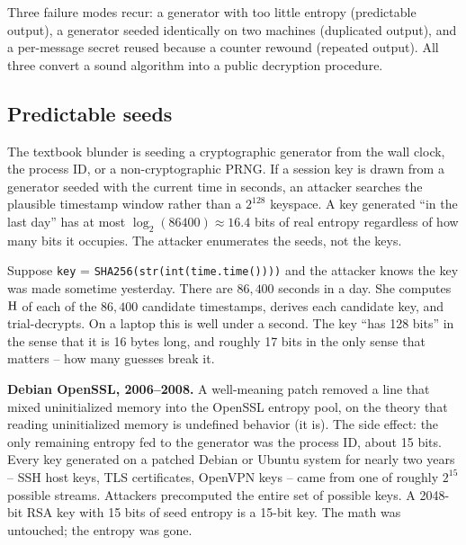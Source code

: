 Three failure modes recur: a generator with too little entropy (predictable output), a generator seeded identically on two machines (duplicated output), and a per-message secret reused because a counter rewound (repeated output). All three convert a sound algorithm into a public decryption procedure.

\subsection{Predictable seeds}
\label{ch38:predictable-seed}

The textbook blunder is seeding a cryptographic generator from the wall clock, the process ID, or a non-cryptographic PRNG. If a session key is drawn from a generator seeded with the current time in seconds, an attacker searches the plausible timestamp window rather than a $2^{128}$ keyspace. A key generated ``in the last day'' has at most $\log_2(86400) \approx 16.4$ bits of real entropy regardless of how many bits it occupies. The attacker enumerates the seeds, not the keys.

\begin{example}
\label{ch38:ex-time-seed}
Suppose \texttt{key} = \texttt{SHA256(\allowbreak str(\allowbreak int(\allowbreak time.\allowbreak time())))\allowbreak [:16]} and the attacker knows the key was made sometime yesterday. There are $86{,}400$ seconds in a day. She computes $\operatorname{H}$ of each of the $86{,}400$ candidate timestamps, derives each candidate key, and trial-decrypts. On a laptop this is well under a second. The key ``has 128 bits'' in the sense that it is 16 bytes long, and roughly 17 bits in the only sense that matters -- how many guesses break it.
\end{example}

\begin{attackbox}
\textbf{Debian OpenSSL, 2006--2008.} A well-meaning patch removed a line that mixed uninitialized memory into the OpenSSL entropy pool, on the theory that reading uninitialized memory is undefined behavior (it is). The side effect: the only remaining entropy fed to the generator was the process ID, about 15 bits. Every key generated on a patched Debian or Ubuntu system for nearly two years -- SSH host keys, TLS certificates, OpenVPN keys -- came from one of roughly $2^{15}$ possible streams. Attackers precomputed the entire set of possible keys. A 2048-bit RSA key with 15 bits of seed entropy is a 15-bit key. The math was untouched; the entropy was gone.
\end{attackbox}


